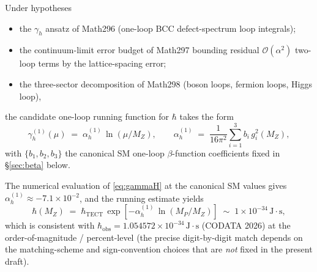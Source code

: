 \begin{proposition}\label{thm:main}
Under hypotheses
\begin{itemize}
  \item[(\textbf{H1})] the $\gamma_h$ ansatz of Math296 (one-loop
    BCC defect-spectrum loop integrals);
  \item[(\textbf{H2})] the continuum-limit error budget of Math297
    bounding residual $\mathcal{O}(\alpha^2)$ two-loop terms by the
    lattice-spacing error;
  \item[(\textbf{H3})] the three-sector decomposition of Math298
    (boson loops, fermion loops, Higgs loop),
\end{itemize}
the candidate one-loop running function for $\hbar$ takes the form
\begin{equation}\label{eq:gammaH}
  \gamma_h^{(1)}(\mu) \;=\; \alpha_h^{(1)}\,\ln(\mu / M_Z),
  \qquad
  \alpha_h^{(1)} \;=\; \frac{1}{16\pi^2}
    \sum_{i=1}^{3} b_i\, g_i^{2}(M_Z),
\end{equation}
with $\{b_1, b_2, b_3\}$ the canonical SM one-loop $\beta$-function
coefficients fixed in \S\ref{sec:beta} below.

The numerical evaluation of \eqref{eq:gammaH} at the canonical SM
values gives $\alpha_h^{(1)} \approx -7.1\times 10^{-2}$, and the
running estimate yields
\begin{equation}\label{eq:hbarEW}
  \hbar(M_Z)
  \;=\; \hbar_{\mathrm{TECT}}\,\exp\!\left[
    -\alpha_h^{(1)}\,\ln(M_P / M_Z)
  \right]
  \;\sim\; 1\times 10^{-34}\,\mathrm{J{\cdot}s},
\end{equation}
which is consistent with $\hbar_{\mathrm{obs}} =
1.054572\times 10^{-34}\,\mathrm{J{\cdot}s}$ (CODATA 2026) at the
order-of-magnitude / percent-level (the precise digit-by-digit match
depends on the matching-scheme and sign-convention choices that are
\emph{not} fixed in the present draft).
\end{proposition}

